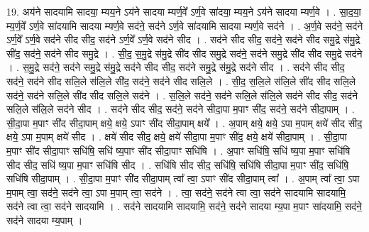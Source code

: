 \documentclass[17pt]{extarticle}
\begin{document}
19. अय॑ने सादयामि सादया॒ म्यय॒ने ऽय॑ने सादया म्यर्ण॒वे᳚ ऽर्ण॒वे सा॑दया॒ म्यय॒ने ऽय॑ने सादया म्यर्ण॒वे । . सा॒द॒या॒ म्य॒र्ण॒वे᳚ ऽर्ण॒वे सा॑दयामि सादया म्यर्ण॒वे सद॑ने॒ सद॑ने ऽर्ण॒वे सा॑दयामि सादया म्यर्ण॒वे सद॑ने । . अ॒र्ण॒वे सद॑ने॒ सद॑ने ऽर्ण॒वे᳚ ऽर्ण॒वे सद॑ने सीद सीद॒ सद॑ने ऽर्ण॒वे᳚ ऽर्ण॒वे सद॑ने सीद । . सद॑ने सीद सीद॒ सद॑ने॒ सद॑ने सीद समु॒द्रे स॑मु॒द्रे सी॑द॒ सद॑ने॒ सद॑ने सीद समु॒द्रे । . सी॒द॒ स॒मु॒द्रे स॑मु॒द्रे सी॑द सीद समु॒द्रे सद॑ने॒ सद॑ने समु॒द्रे सी॑द सीद समु॒द्रे सद॑ने । . स॒मु॒द्रे सद॑ने॒ सद॑ने समु॒द्रे स॑मु॒द्रे सद॑ने सीद सीद॒ सद॑ने समु॒द्रे स॑मु॒द्रे सद॑ने सीद । . सद॑ने सीद सीद॒ सद॑ने॒ सद॑ने सीद सलि॒ले स॑लि॒ले सी॑द॒ सद॑ने॒ सद॑ने सीद सलि॒ले । . सी॒द॒ स॒लि॒ले स॑लि॒ले सी॑द सीद सलि॒ले सद॑ने॒ सद॑ने सलि॒ले सी॑द सीद सलि॒ले सद॑ने । . स॒लि॒ले सद॑ने॒ सद॑ने सलि॒ले स॑लि॒ले सद॑ने सीद सीद॒ सद॑ने सलि॒ले स॑लि॒ले सद॑ने सीद । . सद॑ने सीद सीद॒ सद॑ने॒ सद॑ने सीदा॒पा म॒पाꣳ सी॑द॒ सद॑ने॒ सद॑ने सीदा॒पाम् । . सी॒दा॒पा म॒पाꣳ सी॑द सीदा॒पाम् क्षये॒ क्षये॒ ऽपाꣳ सी॑द सीदा॒पाम् क्षये᳚ । . अ॒पाम् क्षये॒ क्षये॒ ऽपा म॒पाम् क्षये॑ सीद सीद॒ क्षये॒ ऽपा म॒पाम् क्षये॑ सीद । . क्षये॑ सीद सीद॒ क्षये॒ क्षये॑ सीदा॒पा म॒पाꣳ सी॑द॒ क्षये॒ क्षये॑ सीदा॒पाम् । . सी॒दा॒पा म॒पाꣳ सी॑द सीदा॒पाꣳ सधि॑षि॒ सधि॑ ष्य॒पाꣳ सी॑द सीदा॒पाꣳ सधि॑षि । . अ॒पाꣳ सधि॑षि॒ सधि॑ ष्य॒पा म॒पाꣳ सधि॑षि सीद सीद॒ सधि॑ ष्य॒पा म॒पाꣳ सधि॑षि सीद । . सधि॑षि सीद सीद॒ सधि॑षि॒ सधि॑षि सीदा॒पा म॒पाꣳ सी॑द॒ सधि॑षि॒ सधि॑षि सीदा॒पाम् । . सी॒दा॒पा म॒पाꣳ सी॑द सीदा॒पाम् त्वा᳚ त्वा॒ ऽपाꣳ सी॑द सीदा॒पाम् त्वा᳚ । . अ॒पाम् त्वा᳚ त्वा॒ ऽपा म॒पाम् त्वा॒ सद॑ने॒ सद॑ने त्वा॒ ऽपा म॒पाम् त्वा॒ सद॑ने । . त्वा॒ सद॑ने॒ सद॑ने त्वा त्वा॒ सद॑ने सादयामि सादयामि॒ सद॑ने त्वा त्वा॒ सद॑ने सादयामि । . सद॑ने सादयामि सादयामि॒ सद॑ने॒ सद॑ने सादया म्य॒पा म॒पाꣳ सा॑दयामि॒ सद॑ने॒ सद॑ने सादया म्य॒पाम् । \newline
\end{document}
